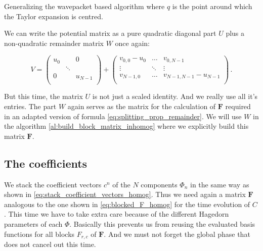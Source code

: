 \begin{chapter}{Generalizing the wavepacket based algorithm}
where $q$ is the point around which the Taylor expansion is centred.

We can write the potential matrix as a pure quadratic diagonal part $U$ plus a
non-quadratic remainder matrix $W$ once again:

\begin{equation} \label{eq:potiential_splitting_inhomog}
  V =
  \begin{pmatrix}
    u_0 & {}     & 0 \\
    {}  & \ddots & {} \\
    0   & {}     & u_{N-1} \\
  \end{pmatrix}
  +
  \begin{pmatrix}
    v_{0,0} - u_0 & \hdots & v_{0,N-1} \\
    \vdots        & \ddots & \vdots \\
    v_{N-1,0}     & \hdots & v_{N-1,N-1} - u_{N-1} \\
  \end{pmatrix} \,.
\end{equation}

But this time, the matrix $U$ is not just a scaled identity. And we really use all it's entries.
The part $W$ again serves as the matrix for the calculation of $\mathbf{F}$ required in an
adapted version of formula \eqref{eq:splitting_prop_remainder}. We will use $W$
in the algorithm \ref{al:build_block_matrix_inhomog} where we explicitly build
this matrix $\mathbf{F}$.

\subsection{The coefficients}

We stack the coefficient vectors $c^n$ of the $N$ components $\Phi_n$ in the same
way as shown in \eqref{eq:stack_coefficient_vectors_homog}. Thus we need again a
matrix $\mathbf{F}$ analogous to the one shown in \eqref{eq:blocked_F_homog} for the
time evolution of $C$. This time we have to take extra care because of the different
Hagedorn parameters of each $\Phi$. Basically this prevents us from reusing the
evaluated basis functions for all blocks $F_{r,c}$ of $\mathbf{F}$. And we must
not forget the global phase that does not cancel out this time.


\end{chapter}
